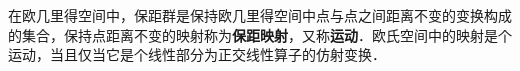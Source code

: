 
在欧几里得空间中，保距群是保持欧几里得空间中点与点之间距离不变的变换构成的集合，保持点距离不变的映射称为\textbf{保距映射}，又称\textbf{运动}．欧氏空间中的映射是个运动，当且仅当它是个线性部分为正交线性算子的仿射变换．